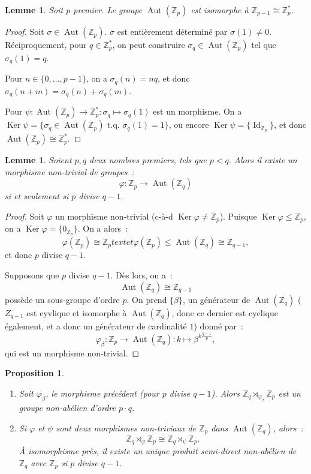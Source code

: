 \documentclass{article}
\newtheorem{prp}[thm]{Proposition}
\newtheorem{lem}[thm]{Lemme}
\theoremstyle{definition}
\theoremstyle{remark}
\DeclareMathOperator{\Id}{Id}
\DeclareMathOperator{\Ker}{Ker}
\DeclareMathOperator{\Aut}{Aut}
\newcommand{\Z}{\mathbb Z}
\newcommand{\tq}{\text{ t.q. }}
\newcommand{\proofright}{{\framebox[1.5\width]{$\Rightarrow$}\hspace{.1cm}}}
\newcommand{\proofleft}{{\framebox[1.5\width]{$\Leftarrow$}\hspace{.1cm}}}
\newcommand{\simeqq}{\cong}
\begin{document}

		\begin{lem} Soit $p$ premier. Le groupe $\Aut(\Z_p)$ est isomorphe à $\Z_{p-1} \simeqq \Z_p^*$.
		\end{lem}

		\begin{proof} Soit $\sigma \in \Aut(\Z_p)$. $\sigma$ est entièrement déterminé par $\sigma(1) \neq 0$. Réciproquement, pour $q \in \Z_p^*$,
		on peut construire $\sigma_q \in \Aut(\Z_p)$ tel que $\sigma_q(1) = q$.

		Pour $n \in \{0, \ldots, p-1\}$, on a $\sigma_q(n) = nq$, et donc $\sigma_q(n+m) = \sigma_q(n) + \sigma_q(m)$.

		Pour $\psi : \Aut(\Z_p) \to \Z_p^* : \sigma_q \mapsto \sigma_q(1)$ est un morphisme. On a $\Ker \psi = \{\sigma_q \in \Aut(\Z_p) \tq \sigma_q(1) = 1\}$,
		ou encore $\Ker \psi = \{\Id_{\Z_p}\}$, et donc $\Aut(\Z_p) \simeqq \Z_p^*$.
		\end{proof}

		\begin{lem} Soient $p, q$ deux nombres premiers, tels que $p < q$. Alors il existe un morphisme non-trivial de groupes~:
		\[\varphi : \Z_p \to \Aut(\Z_q)\]
		si et seulement si $p$ divise $q-1$.
		\end{lem}

		\begin{proof} \proofright Soit $\varphi$ un morphisme non-trivial (c-à-d $\Ker \varphi \neq \Z_p$). Puisque $\Ker \varphi \leq \Z_p$, on a $\Ker\varphi
		= \{0_{\Z_p}\}$. On a alors~:
		\[\varphi\left(\Z_p\right) \simeqq \Z_p text{ et } \varphi(\Z_p) \leq \Aut(\Z_q) \simeqq \Z_{q-1},\]
		et donc $p$ divise $q-1$.

		\proofleft Supposons que $p$ divise $q-1$. Dès lors, on a~:
		\[\Aut(\Z_q) \simeqq \Z_{q-1}\]
		possède un sous-groupe d'ordre $p$. On prend $\{\beta\}$, un générateur de $\Aut(\Z_q)$ ($Z_{q-1}$ est cyvlique et isomorphe à $\Aut(\Z_q)$, donc ce
		dernier est cyclique également, et a donc un générateur de cardinalité $1$) donné par~:
		\[\varphi_\beta : \Z_p \to \Aut(\Z_q) : k \mapsto \beta^{k\frac {q-1}p},\]
		qui est un morphisme non-trivial.
		\end{proof}

		\begin{prp}~
		\begin{enumerate}
			\item Soit $\varphi_\beta$, le morphisme précédent (pour $p$ divise $q-1$). Alors $\Z_q \rtimes_{\varphi_\beta} \Z_p$ est un groupe non-abélien
			d'ordre $p \cdot q$.

			\item Si $\varphi$ et $\psi$ sont deux morphismes non-triviaux de $\Z_p$ dans $\Aut(\Z_q)$, alors~:
			\[\Z_q \rtimes_\varphi \Z_p \simeqq \Z_q \rtimes_\psi \Z_p.\]
			À isomorphisme près, il existe un unique produit semi-direct non-abélien de $\Z_q$ avec $\Z_p$ si $p$ divise $q-1$.
		\end{enumerate}
		\end{prp}
\end{document}
